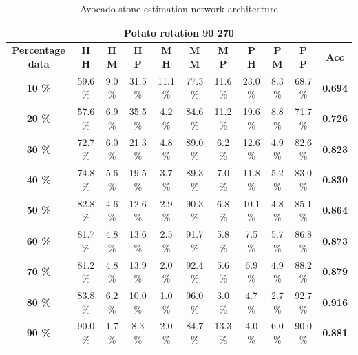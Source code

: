 \documentclass[11pt]{article}
\begin{document}
  \begin{table}[h!]
  \centering
  \begin{adjustbox}{max width=\textwidth}
  \begin{tabular}{*{11}{c}}%
  \hline
  \multicolumn{11}{c}{\textbf{Potato rotation 90 270}}
  \\
 \hline
 \textbf{Percentage data} & \textbf{H H} & \textbf{H M} & \textbf{H P} & \textbf{M H} & \textbf{M M} & \textbf{M P} & \textbf{P H} & \textbf{P M} & \textbf{P P} & \textbf{Acc}\\
 \hline
 \hline
 \textbf{10 \%}  & 59.6 \% & 9.0 \% & 31.5 \% & 11.1 \% & 77.3 \% & 11.6 \% & 23.0 \% & 8.3 \% & 68.7 \% & \textbf{0.694} \\
 \hline
 \textbf{20 \%} & 57.6 \% & 6.9 \% & 35.5 \% & 4.2 \% & 84.6 \% & 11.2 \% & 19.6 \% & 8.8 \% & 71.7 \% & \textbf{0.726} \\
 \hline
 \textbf{30 \%} & 72.7 \% & 6.0 \% & 21.3 \% & 4.8 \% & 89.0 \% & 6.2 \% & 12.6 \% & 4.9 \% & 82.6 \% & \textbf{0.823} \\
 \hline
 \textbf{40 \%} & 74.8 \% & 5.6 \% & 19.5 \% & 3.7 \% & 89.3 \% & 7.0 \% & 11.8 \% & 5.2 \%  & 83.0 \% & \textbf{0.830} \\
 \hline
 \textbf{50 \%} & 82.8 \% & 4.6 \% & 12.6 \% & 2.9 \% & 90.3 \% & 6.8 \% & 10.1 \% & 4.8 \% & 85.1 \% & \textbf{0.864} \\
 \hline
 \textbf{60 \%} & 81.7 \% & 4.8 \% & 13.6 \% & 2.5 \% & 91.7 \% & 5.8 \% & 7.5 \% & 5.7 \% & 86.8 \% & \textbf{0.873} \\
 \hline
 \textbf{70 \%} & 81.2 \% & 4.8 \% & 13.9 \% & 2.0 \% & 92.4 \% & 5.6 \% & 6.9 \% & 4.9 \% & 88.2 \% & \textbf{0.879} \\
 \hline
\textbf{80 \%} & 83.8 \% & 6.2 \% & 10.0 \%  & 1.0 \% & 96.0 \% & 3.0 \% & 4.7 \% & 2.7 \% & 92.7 \% & \textbf{0.916} \\
 \hline
 \textbf{90 \%} & 90.0 \% & 1.7 \% & 8.3 \% & 2.0 \% & 84.7 \% & 13.3 \% & 4.0 \% & 6.0 \% & 90.0 \% & \textbf{0.881} \\
 \hline
\end{tabular}
\end{adjustbox}
  \caption{Avocado stone estimation network architecture}
  \label{tab:experiments_avo_cnn}
\end{table}
\end{document}
